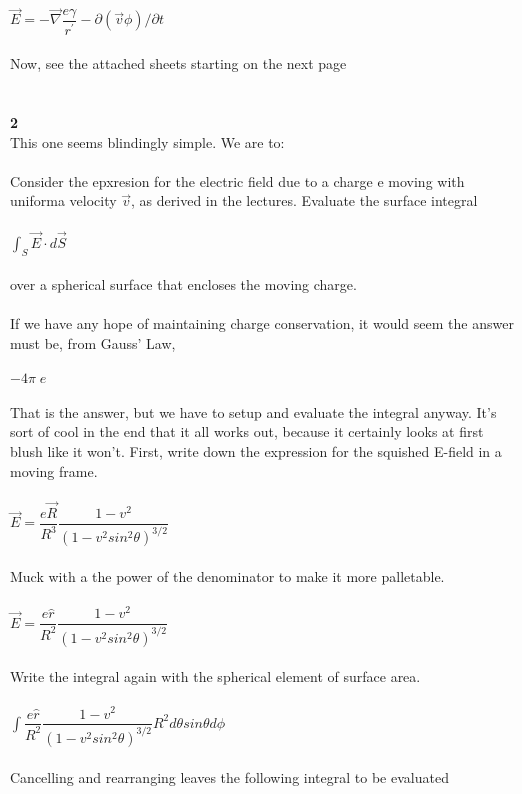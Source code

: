 \documentclass[prb,preprint]
{revtex4-1}
\newcommand{\PRLsep}{\noindent\makebox[\linewidth]{\resizebox{0.8888\linewidth}{2pt}{$\bullet$}}\bigskip}
\begin{document}
$\vec{E} = -\vec{\nabla}\dfrac{e\gamma}{r^\prime} - \partial\left(\vec{v}\phi\right)/\partial t$
\\
\\
Now, see the attached sheets starting on the next page
\\
\\
\PRLsep
\\
\newpage
\textbf{2}
\\
This one seems blindingly simple.  We are to:
\\
\\
Consider the epxresion for the electric field due to a charge e moving with uniforma velocity $\vec{v}$, as derived in the lectures.  Evaluate the surface integral 
\\
\\
$\int_S \vec{E}\cdot d\vec{S}$
\\
\\
over a spherical surface that encloses the moving charge.
\\
\\
If we have any hope of maintaining charge conservation, it would seem the answer must be, from Gauss' Law,
\\
\\
$-4 \pi\;e$
\\
\\
That is the answer, but we have to setup and evaluate the integral anyway.  It's sort of cool in the end that it all works out, because it certainly looks at first blush like it won't.  First, write down the expression for the squished E-field in a moving frame.
\\
\\
$\vec{E} = \dfrac{e\vec{R}}{R^3}\dfrac{1-v^2}{\left(1-v^2sin^2\theta\right)^{3/2}}$
\\
\\
Muck with a the power of the denominator to make it more palletable.
\\
\\
$\vec{E} = \dfrac{e\hat{r}}{R^2}\dfrac{1-v^2}{\left(1-v^2sin^2\theta\right)^{3/2}}$
\\
\\
Write the integral again with the spherical element of surface area.
\\
\\
$\int \dfrac{e\hat{r}}{R^2}\dfrac{1-v^2}{\left(1-v^2sin^2\theta\right)^{3/2}} R^2 d\theta sin \theta d\phi$
\\
\\
Cancelling and rearranging leaves the following integral to be evaluated
\end{document}
